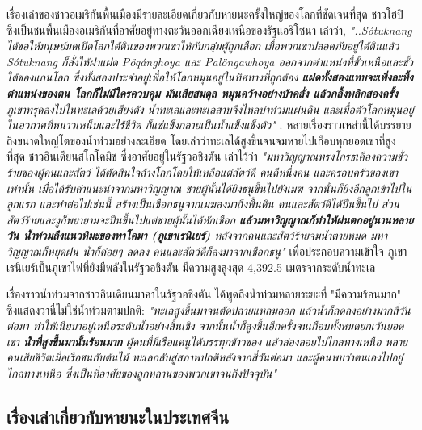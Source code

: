\documentclass[10pt,twocolumn,letterpaper]{article}
\begin{document}
เรื่องเล่าของชาวอเมริกันพื้นเมืองมีรายละเอียดเกี่ยวกับหายนะครั้งใหญ่ของโลกที่ชัดเจนที่สุด ชาวโฮปิ ซึ่งเป็นชนพื้นเมืองอเมริกันที่อาศัยอยู่ทางตะวันออกเฉียงเหนือของรัฐแอริโซนา เล่าว่า, \textit{"..Sótuknang ได้ขอให้มนุษย์มดเปิดโลกใต้ดินของพวกเขาให้กับกลุ่มผู้ถูกเลือก เมื่อพวกเขาปลอดภัยอยู่ใต้ดินแล้ว Sótuknang ก็สั่งให้ฝาแฝด Pöqánghoya และ Palöngawhoya ออกจากตำแหน่งที่ขั้วเหนือและขั้วใต้ของแกนโลก ซึ่งทั้งสองประจำอยู่เพื่อให้โลกหมุนอยู่ในทิศทางที่ถูกต้อง \textbf{แฝดทั้งสองแทบจะเพิ่งละทิ้งตำแหน่งของตน โลกก็ไม่มีใครควบคุม มันเสียสมดุล หมุนคว้างอย่างบ้าคลั่ง แล้วกลิ้งพลิกสองครั้ง} ภูเขาทรุดลงไปในทะเลด้วยเสียงดัง น้ำทะเลและทะเลสาบจึงไหลบ่าท่วมแผ่นดิน และเมื่อตัวโลกหมุนอยู่ในอวกาศที่หนาวเหน็บและไร้ชีวิต ก็แช่แข็งกลายเป็นน้ำแข็งแข็งตัว"} \cite{4}.
หลายเรื่องราวเหล่านี้ได้บรรยายถึงขนาดใหญ่โตของน้ำท่วมอย่างละเอียด โดยเล่าว่าทะเลได้สูงขึ้นจนจมหายไปเกือบทุกยอดเขาที่สูงที่สุด ชาวอินเดียนสโกโคมิช ซึ่งอาศัยอยู่ในรัฐวอชิงตัน เล่าไว้ว่า \textit{"มหาวิญญาณทรงโกรธเคืองความชั่วร้ายของผู้คนและสัตว์ ได้ตัดสินใจล้างโลกโดยให้เหลือแต่สัตว์ดี คนดีหนึ่งคน และครอบครัวของเขาเท่านั้น เมื่อได้รับคำแนะนำจากมหาวิญญาณ ชายผู้นั้นได้ยิงธนูขึ้นไปยังเมฆ จากนั้นก็ยิงอีกลูกเข้าไปในลูกแรก และทำต่อไปเช่นนี้ สร้างเป็นเชือกธนูจากเมฆลงมาถึงพื้นดิน คนและสัตว์ดีได้ปีนขึ้นไป ส่วนสัตว์ร้ายและงูก็พยายามจะปีนขึ้นไปแต่ชายผู้นั้นได้หักเชือก \textbf{แล้วมหาวิญญาณก็ทำให้ฝนตกอยู่นานหลายวัน น้ำท่วมถึงแนวหิมะของทาโคมา (ภูเขาเรนิเยร์)} หลังจากคนและสัตว์ร้ายจมน้ำตายหมด มหาวิญญาณก็หยุดฝน น้ำก็ค่อยๆ ลดลง คนและสัตว์ดีก็ลงมาจากเชือกธนู"} \cite{3} เพื่อประกอบความเข้าใจ ภูเขาเรนิเยร์เป็นภูเขาไฟที่ยังมีพลังในรัฐวอชิงตัน มีความสูงสูงสุด 4,392.5 เมตรจากระดับน้ำทะเล

เรื่องราวน้ำท่วมจากชาวอินเดียนมาคาในรัฐวอชิงตัน ได้พูดถึงน้ำท่วมหลายระยะที่ "มีความร้อนมาก" ซึ่งแสดงว่านี่ไม่ใช่น้ำท่วมตามปกติ: \textit{"ทะเลสูงขึ้นมาจนตัดปลายแหลมออก แล้วน้ำก็ลดลงอย่างมากสี่วันต่อมา ทำให้เนียบาอยู่เหนือระดับน้ำอย่างสิ้นเชิง จากนั้นน้ำก็สูงขึ้นอีกครั้งจนเกือบทั้งหมดยกเว้นยอดเขา \textbf{น้ำที่สูงขึ้นมานั้นร้อนมาก} ผู้คนที่มีเรือแคนูได้บรรทุกข้าวของ แล้วล่องลอยไปไกลทางเหนือ หลายคนเสียชีวิตเมื่อเรือชนกับต้นไม้ ทะเลกลับสู่สภาพปกติหลังจากสี่วันต่อมา และผู้คนพบว่าตนเองไปอยู่ไกลทางเหนือ ซึ่งเป็นที่อาศัยของลูกหลานของพวกเขาจนถึงปัจจุบัน"} \cite{3}

\subsection{เรื่องเล่าเกี่ยวกับหายนะในประเทศจีน}
\end{document}
